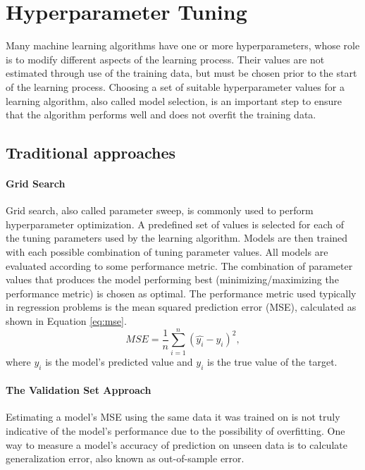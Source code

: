 \chapter{Hyperparameter Tuning}
Many machine learning algorithms have one or more hyperparameters, whose role is to modify different aspects of the learning process. Their values are not estimated through use of the training data, but must be chosen prior to the start of the learning process. Choosing a set of suitable hyperparameter values for a learning algorithm, also called model selection, is an important step to ensure that the algorithm performs well and does not overfit the training data.

\section{Traditional approaches}

\subsubsection{Grid Search}
Grid search, also called parameter sweep, is commonly used to perform hyperparameter optimization. A predefined set of values is selected for each of the tuning parameters used by the learning algorithm. Models are then trained with each possible combination of tuning parameter values. All models are evaluated according to some performance metric. The combination of parameter values that produces the model performing best (minimizing/maximizing the performance metric) is chosen as optimal. The performance metric used typically in regression problems is the mean squared prediction error (MSE), calculated as shown in Equation \ref{eq:mse}.
\begin{equation} \label{eq:mse}
MSE = \frac{1}{n} \sum_{i=1}^{n} (\hat{y_i}-y_i)^2, 
\end{equation}
where $\hat{y_i}$ is the model's predicted value and $y_i$ is the true value of the target. 

\subsubsection{The Validation Set Approach}
Estimating a model's MSE using the same data it was trained on is not truly indicative of the model's performance due to the possibility of overfitting. One way to measure a model's accuracy of prediction on unseen data is to calculate generalization error, also known as out-of-sample error. 

